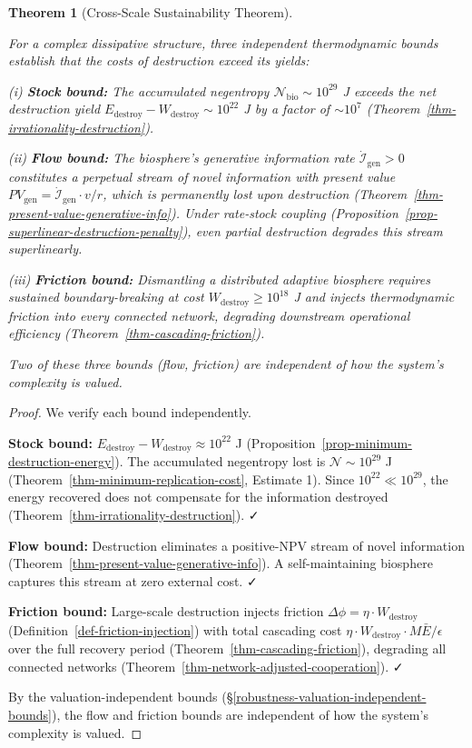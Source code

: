 \documentclass[11pt]{article}
\theoremstyle{plain}
\newtheorem{theorem}{Theorem}
\theoremstyle{definition}
\theoremstyle{remark}
\begin{document}
\begin{theorem}[Cross-Scale Sustainability Theorem]
\label{thm-negentropy-defense}

For a complex dissipative structure, three independent thermodynamic bounds establish that the costs of destruction exceed its yields:

(i) \textbf{Stock bound:} The accumulated negentropy $\mathcal{N}_{\text{bio}} \sim 10^{29}$ J exceeds the net destruction yield $E_{\text{destroy}} - W_{\text{destroy}} \sim 10^{22}$ J by a factor of $\sim 10^7$ (Theorem~\ref{thm-irrationality-destruction}).

(ii) \textbf{Flow bound:} The biosphere's generative information rate $\dot{\mathcal{I}}_{\text{gen}} > 0$ constitutes a perpetual stream of novel information with present value $PV_{\text{gen}} = \dot{\mathcal{I}}_{\text{gen}} \cdot v / r$, which is permanently lost upon destruction (Theorem~\ref{thm-present-value-generative-info}). Under rate-stock coupling (Proposition~\ref{prop-superlinear-destruction-penalty}), even partial destruction degrades this stream superlinearly.

(iii) \textbf{Friction bound:} Dismantling a distributed adaptive biosphere requires sustained boundary-breaking at cost $W_{\text{destroy}} \geq 10^{18}$ J and injects thermodynamic friction into every connected network, degrading downstream operational efficiency (Theorem~\ref{thm-cascading-friction}).

Two of these three bounds (flow, friction) are independent of how the system's complexity is valued.
\end{theorem}

\begin{proof}
We verify each bound independently.

\textbf{Stock bound:} $E_{\text{destroy}} - W_{\text{destroy}} \approx 10^{22}$ J (Proposition~\ref{prop-minimum-destruction-energy}). The accumulated negentropy lost is $\mathcal{N} \sim 10^{29}$ J (Theorem~\ref{thm-minimum-replication-cost}, Estimate 1). Since $10^{22} \ll 10^{29}$, the energy recovered does not compensate for the information destroyed (Theorem~\ref{thm-irrationality-destruction}). ✓

\textbf{Flow bound:} Destruction eliminates a positive-NPV stream of novel information (Theorem~\ref{thm-present-value-generative-info}). A self-maintaining biosphere captures this stream at zero external cost. ✓

\textbf{Friction bound:} Large-scale destruction injects friction $\Delta\phi = \eta \cdot W_{\text{destroy}}$ (Definition~\ref{def-friction-injection}) with total cascading cost $\eta \cdot W_{\text{destroy}} \cdot M \bar{E} / \epsilon$ over the full recovery period (Theorem~\ref{thm-cascading-friction}), degrading all connected networks (Theorem~\ref{thm-network-adjusted-cooperation}). ✓

By the valuation-independent bounds (§\ref{robustness-valuation-independent-bounds}), the flow and friction bounds are independent of how the system's complexity is valued.
\end{proof}
\end{document}

